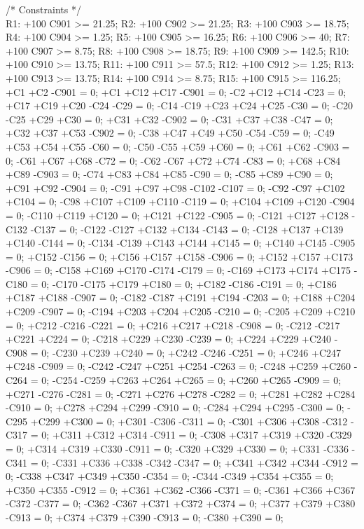 /* Constraints */ \\
R1: +100 C901 >= 21.25;
R2: +100 C902 >= 21.25;
R3: +100 C903 >= 18.75;
R4: +100 C904 >= 1.25;
R5: +100 C905 >= 16.25;
R6: +100 C906 >= 40;
R7: +100 C907 >= 8.75;
R8: +100 C908 >= 18.75;
R9: +100 C909 >= 142.5;
R10: +100 C910 >= 13.75;
R11: +100 C911 >= 57.5;
R12: +100 C912 >= 1.25;
R13: +100 C913 >= 13.75;
R14: +100 C914 >= 8.75;
R15: +100 C915 >= 116.25;
+C1 +C2 -C901 = 0;
+C1 +C12 +C17 -C901 = 0;
-C2 +C12 +C14 -C23 = 0;
+C17 +C19 +C20 -C24 -C29 = 0;
-C14 -C19 +C23 +C24 +C25 -C30 = 0;
-C20 -C25 +C29 +C30 = 0;
+C31 +C32 -C902 = 0;
-C31 +C37 +C38 -C47 = 0;
+C32 +C37 +C53 -C902 = 0;
-C38 +C47 +C49 +C50 -C54 -C59 = 0;
-C49 +C53 +C54 +C55 -C60 = 0;
-C50 -C55 +C59 +C60 = 0;
+C61 +C62 -C903 = 0;
-C61 +C67 +C68 -C72 = 0;
-C62 -C67 +C72 +C74 -C83 = 0;
+C68 +C84 +C89 -C903 = 0;
-C74 +C83 +C84 +C85 -C90 = 0;
-C85 +C89 +C90 = 0;
+C91 +C92 -C904 = 0;
-C91 +C97 +C98 -C102 -C107 = 0;
-C92 -C97 +C102 +C104 = 0;
-C98 +C107 +C109 +C110 -C119 = 0;
+C104 +C109 +C120 -C904 = 0;
-C110 +C119 +C120 = 0;
+C121 +C122 -C905 = 0;
-C121 +C127 +C128 -C132 -C137 = 0;
-C122 -C127 +C132 +C134 -C143 = 0;
-C128 +C137 +C139 +C140 -C144 = 0;
-C134 -C139 +C143 +C144 +C145 = 0;
+C140 +C145 -C905 = 0;
+C152 -C156 = 0;
+C156 +C157 +C158 -C906 = 0;
+C152 +C157 +C173 -C906 = 0;
-C158 +C169 +C170 -C174 -C179 = 0;
-C169 +C173 +C174 +C175 -C180 = 0;
-C170 -C175 +C179 +C180 = 0;
+C182 -C186 -C191 = 0;
+C186 +C187 +C188 -C907 = 0;
-C182 -C187 +C191 +C194 -C203 = 0;
+C188 +C204 +C209 -C907 = 0;
-C194 +C203 +C204 +C205 -C210 = 0;
-C205 +C209 +C210 = 0;
+C212 -C216 -C221 = 0;
+C216 +C217 +C218 -C908 = 0;
-C212 -C217 +C221 +C224 = 0;
-C218 +C229 +C230 -C239 = 0;
+C224 +C229 +C240 -C908 = 0;
-C230 +C239 +C240 = 0;
+C242 -C246 -C251 = 0;
+C246 +C247 +C248 -C909 = 0;
-C242 -C247 +C251 +C254 -C263 = 0;
-C248 +C259 +C260 -C264 = 0;
-C254 -C259 +C263 +C264 +C265 = 0;
+C260 +C265 -C909 = 0;
+C271 -C276 -C281 = 0;
-C271 +C276 +C278 -C282 = 0;
+C281 +C282 +C284 -C910 = 0;
+C278 +C294 +C299 -C910 = 0;
-C284 +C294 +C295 -C300 = 0;
-C295 +C299 +C300 = 0;
+C301 -C306 -C311 = 0;
-C301 +C306 +C308 -C312 -C317 = 0;
+C311 +C312 +C314 -C911 = 0;
-C308 +C317 +C319 +C320 -C329 = 0;
+C314 +C319 +C330 -C911 = 0;
-C320 +C329 +C330 = 0;
+C331 -C336 -C341 = 0;
-C331 +C336 +C338 -C342 -C347 = 0;
+C341 +C342 +C344 -C912 = 0;
-C338 +C347 +C349 +C350 -C354 = 0;
-C344 -C349 +C354 +C355 = 0;
+C350 +C355 -C912 = 0;
+C361 +C362 -C366 -C371 = 0;
-C361 +C366 +C367 -C372 -C377 = 0;
-C362 -C367 +C371 +C372 +C374 = 0;
+C377 +C379 +C380 -C913 = 0;
+C374 +C379 +C390 -C913 = 0;
-C380 +C390 = 0;

